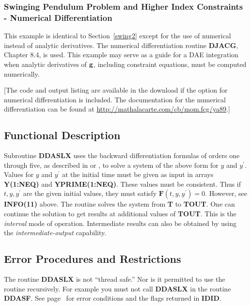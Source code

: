 \documentclass[twoside]{MATH77}
\begin{document}
\subsubsection{Swinging Pendulum Problem and Higher Index
  Constraints - Numerical Differentiation\label{swing3}}
This example is identical to Section~\ref{swing2} except for the use of 
numerical instead of analytic derivatives.  The numerical differentiation
routine {\bf DJACG}, Chapter 8.4, is used.  This example may serve as a guide for 
a DAE integration when analytic derivatives of ${\bf g}$, including constraint
equations,  must be computed numerically.

[The code and output listing are available in the download if the option for
numerical differentiation is included.  The documentation for the numerical
differentiation can be found at
\url{http://mathalacarte.com/cb/mom.fcg/ya89}.]

\subsection{Functional Description}
Subroutine \textbf{DDASLX} uses the backward differentiation formulas of
orders one through five, as described in \cite[pp. 115--129]{Brenan:1996:DAE}
or \cite{Petzold:1982:DAS}, to solve a system of the above form for $y$ and
$y^{\prime}$. Values for $y$ and $y^{\prime}$ at the initial time must be
given as input in arrays \textbf{Y(1:NEQ)} and \textbf{YPRIME(1:NEQ)}.  These
values must be consistent.  Thus if $t,y,y^{\prime}$ are the given initial
values, they must satisfy $\mathbf{F}(t,y,y^{\prime}) =0$.  However, see
\textbf{INFO(11)} above.  The routine solves the system from \textbf{T} to
\textbf{TOUT}.  One can continue the solution to get results at additional
values of \textbf{TOUT}.  This is the \emph{interval} mode of operation.
Intermediate results can also be obtained by using the
\emph{intermediate-output} capability.




\subsection{Error Procedures and Restrictions}
The routine \textbf{DDASLX} is not ``thread safe.''  Nor is it permitted to
use the routine recursively.  For example you must not call \textbf{DDASLX} in
the routine \textbf{DDASF}.  See page~\pageref{task_int} for error conditions
and the flags returned in \textbf{IDID}.
\end{document}
